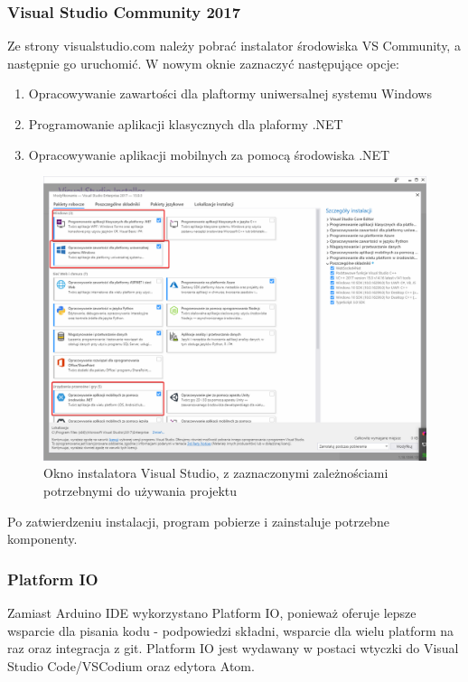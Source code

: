\documentclass{report}
\begin{document}
        \subsubsection{Visual Studio Community 2017}
        Ze strony visualstudio.com należy pobrać instalator środowiska VS Community, a następnie go uruchomić. W nowym oknie zaznaczyć następujące opcje:
        \begin{enumerate}
            \item Opracowywanie zawartości dla plaftormy uniwersalnej systemu Windows
            \item Programowanie aplikacji klasycznych dla plaformy .NET
            \item Opracowywanie aplikacji mobilnych za pomocą środowiska .NET
        \end{enumerate}
    	\begin{figure}[H]
    		\centering
    		\includegraphics[scale=0.3]{visual_1.png}
    		\caption{Okno instalatora Visual Studio, z zaznaczonymi zależnościami potrzebnymi do używania projektu}
    	\end{figure}
        Po zatwierdzeniu instalacji, program pobierze i zainstaluje potrzebne komponenty.
        \subsubsection{Platform IO}
		Zamiast Arduino IDE wykorzystano Platform IO, ponieważ oferuje lepsze wsparcie dla pisania kodu - podpowiedzi składni, wsparcie dla wielu platform na raz oraz integracja z git. Platform IO jest wydawany w postaci wtyczki do Visual Studio Code/VSCodium oraz edytora Atom. 
\end{document}
